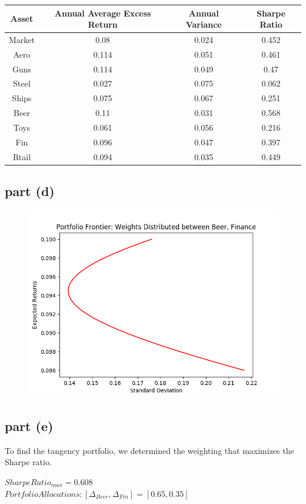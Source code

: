 \documentclass[12pt]{article}
\begin{document}
			\begin{center}
 			\begin{tabular}{||c|c|c|c||} 
 				\hline
 					Asset & Annual Average Excess Return & Annual Variance & Sharpe Ratio \\
 				\hline\hline
 					Market & 0.08 & 0.024 & 0.452 \\ 
 				\hline
					Aero & 0.114 & 0.051 & 0.461 \\
 				\hline
 					Guns & 0.114 & 0.049 & 0.47 \\
 				\hline
 					Steel & 0.027 & 0.075 & 0.062 \\
 				\hline
 					Ships & 0.075 & 0.067 & 0.251 \\
				 \hline
				  	Beer & 0.11 & 0.031 & 0.568 \\
				 \hline
				  	Toys & 0.061 & 0.056 & 0.216 \\				 
				  \hline
				  	Fin & 0.096 & 0.047 & 0.397 \\
				  \hline
					Rtail & 0.094 & 0.035 & 0.449 \\
				  \hline
					
			\end{tabular}
			\end{center}
			
		\subsection{part (d)}
		
			\begin{figure}[h]
			\centering
				\includegraphics[scale=0.75]{hw1_image2.png}
			\end{figure}
		
		\subsection{part (e)}
		
			To find the tangency portfolio, we determined the weighting that maximizes the Sharpe ratio. \\
			
			\begin{center}
				$SharpeRatio_{max} = 0.608$ \\
				$Portfolio Allocations: [\Delta_{Beer}, \Delta_{Fin}] = [0.65, 0.35]$ \\
			\end{center}
		
			
\end{document}
